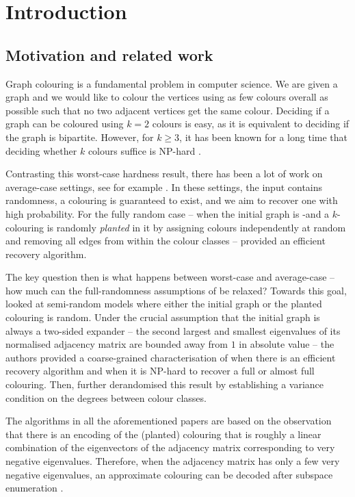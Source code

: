 \chapter{Introduction}

\section{Motivation and related work}

Graph colouring is a fundamental problem in computer science. We are given a graph and we would like to colour the vertices using as few colours overall as possible such that no two adjacent vertices get the same colour. Deciding if a graph can be coloured using $k=2$ colours is easy, as it is equivalent to deciding if the graph is bipartite. However, for \(k\ge 3\), it has been known for a long time that deciding whether \(k\) colours suffice is NP-hard \cite{MR4679190-Karp72}.

Contrasting this worst-case hardness result, there has been a lot of work on average-case settings, see for example \cite{MR1344544-Blum95}. In these settings, the input contains randomness, a colouring is guaranteed to exist, and we aim to recover one with high probability. For the fully random case -- when the initial graph is \Erdos-\Renyi and a $k$-colouring is randomly \textit{planted} in it by assigning colours independently at random and removing all edges from within the colour classes -- \cite{MR1484153-Alon97} provided an efficient recovery algorithm.

The key question then is what happens between worst-case and average-case -- how much can the full-randomness assumptions of \cite{MR1484153-Alon97} be relaxed? Towards this goal, \cite{MR3536556-David16} looked at semi-random models where either the initial graph or the planted colouring is random. Under the crucial assumption that the initial graph is always a two-sided expander -- the second largest and smallest eigenvalues of its normalised adjacency matrix are bounded away from \(1\) in absolute value -- the authors provided a coarse-grained characterisation of when there is an efficient recovery algorithm and when it is NP-hard to recover a full or almost full colouring. Then, \cite{kumar2018finding} further derandomised this result by establishing a variance condition on the degrees between colour classes.

The algorithms in all the aforementioned papers are based on the observation that there is an encoding of the (planted) colouring that is roughly a linear combination of the eigenvectors of the adjacency matrix corresponding to very negative eigenvalues. Therefore, when the adjacency matrix has only a few very negative eigenvalues, an approximate colouring can be decoded after subspace enumeration \cite{kumar2018finding}.

